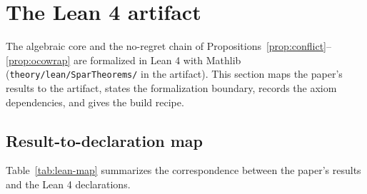 \section{The Lean 4 artifact}
\label{app:lean}
\setcounter{figure}{0}\setcounter{table}{0}

The algebraic core and the no-regret chain of Propositions~\ref{prop:conflict}--\ref{prop:ocowrap} are formalized in Lean 4 with Mathlib (\texttt{theory/lean/SparTheorems/} in the artifact).
This section maps the paper's results to the artifact, states the formalization boundary, records the axiom dependencies, and gives the build recipe.

\subsection{Result-to-declaration map}
Table~\ref{tab:lean-map} summarizes the correspondence between the paper's results and the Lean 4 declarations.

